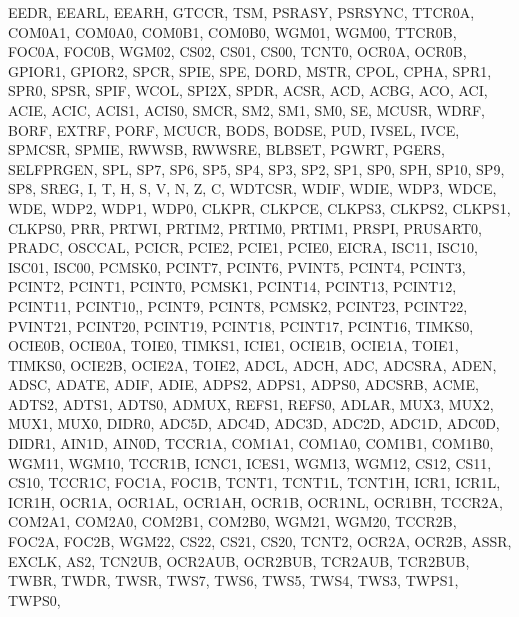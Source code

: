 {{                EEDR, EEARL, EEARH,
                GTCCR, TSM, PSRASY, PSRSYNC,
                TTCR0A, COM0A1, COM0A0, COM0B1, COM0B0, WGM01, WGM00,
                TTCR0B, FOC0A, FOC0B, WGM02, CS02, CS01, CS00,
                TCNT0, OCR0A, OCR0B,
                GPIOR1, GPIOR2,
                SPCR, SPIE, SPE, DORD, MSTR, CPOL, CPHA, SPR1, SPR0,
                SPSR, SPIF, WCOL, SPI2X,
                SPDR,
                ACSR, ACD, ACBG, ACO, ACI, ACIE, ACIC, ACIS1, ACIS0,
                SMCR, SM2, SM1, SM0, SE,
                MCUSR, WDRF, BORF, EXTRF, PORF,
                MCUCR, BODS, BODSE, PUD, IVSEL, IVCE,
                SPMCSR, SPMIE, RWWSB, RWWSRE, BLBSET, PGWRT, PGERS, SELFPRGEN,
                SPL, SP7, SP6, SP5, SP4, SP3, SP2, SP1, SP0, 
                SPH, SP10, SP9, SP8,
                SREG, I, T, H, S, V, N, Z, C,
                WDTCSR, WDIF, WDIE, WDP3, WDCE, WDE, WDP2, WDP1, WDP0,
                CLKPR, CLKPCE, CLKPS3, CLKPS2, CLKPS1, CLKPS0,
                PRR, PRTWI, PRTIM2, PRTIM0, PRTIM1, PRSPI, PRUSART0, PRADC,
                OSCCAL,
                PCICR, PCIE2, PCIE1, PCIE0,
                EICRA, ISC11, ISC10, ISC01, ISC00,
                PCMSK0, PCINT7, PCINT6, PVINT5, PCINT4, PCINT3, PCINT2, PCINT1, PCINT0,
                PCMSK1, PCINT14, PCINT13, PCINT12, PCINT11, PCINT10,, PCINT9, PCINT8,
                PCMSK2, PCINT23, PCINT22, PVINT21, PCINT20, PCINT19, PCINT18, PCINT17, PCINT16,
                TIMKS0, OCIE0B, OCIE0A, TOIE0,
                TIMKS1, ICIE1, OCIE1B, OCIE1A, TOIE1,
                TIMKS0, OCIE2B, OCIE2A, TOIE2,
                ADCL, ADCH, ADC,
                ADCSRA, ADEN, ADSC, ADATE, ADIF, ADIE, ADPS2, ADPS1, ADPS0,
                ADCSRB, ACME, ADTS2, ADTS1, ADTS0,
                ADMUX, REFS1, REFS0, ADLAR, MUX3, MUX2, MUX1, MUX0,
                DIDR0, ADC5D, ADC4D, ADC3D, ADC2D, ADC1D, ADC0D,
                DIDR1, AIN1D, AIN0D,
                TCCR1A, COM1A1, COM1A0, COM1B1, COM1B0, WGM11, WGM10,
                TCCR1B, ICNC1, ICES1, WGM13, WGM12, CS12, CS11, CS10,
                TCCR1C, FOC1A, FOC1B,
                TCNT1, TCNT1L, TCNT1H,
                ICR1, ICR1L, ICR1H,
                OCR1A, OCR1AL, OCR1AH,
                OCR1B, OCR1NL, OCR1BH,
                TCCR2A, COM2A1, COM2A0, COM2B1, COM2B0, WGM21, WGM20,
                TCCR2B, FOC2A, FOC2B, WGM22, CS22, CS21, CS20,
                TCNT2, OCR2A, OCR2B,
                ASSR, EXCLK, AS2, TCN2UB, OCR2AUB, OCR2BUB, TCR2AUB, TCR2BUB,
                TWBR, TWDR,
                TWSR, TWS7, TWS6, TWS5, TWS4, TWS3, TWPS1, TWPS0,
}}
